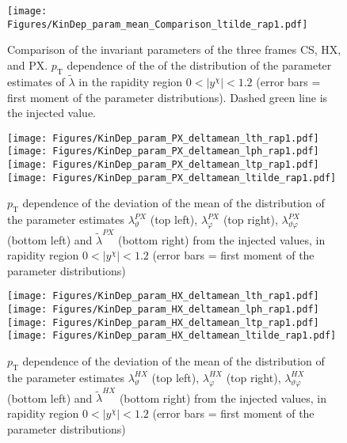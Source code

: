 \documentclass[12pt]{article}
\newcommand{\pT}{p_\mathrm{T}}
\newcommand{\absy}{\left |  y^{\chi} \right |}
\newcommand{\lamtilde}{\tilde{\lambda}}
\newcommand{\lamthHX}{\lambda^{\scriptscriptstyle HX}_\vartheta}
\newcommand{\lamphHX}{\lambda^{\scriptscriptstyle HX}_\varphi}
\newcommand{\lamthphHX}{\lambda^{\scriptscriptstyle HX}_{\vartheta \varphi}}
\newcommand{\lamtildeHX}{\tilde{\lambda}^{\scriptscriptstyle HX}}
\newcommand{\lamthPX}{\lambda^{\scriptscriptstyle PX}_\vartheta}
\newcommand{\lamphPX}{\lambda^{\scriptscriptstyle PX}_\varphi}
\newcommand{\lamthphPX}{\lambda^{\scriptscriptstyle PX}_{\vartheta \varphi}}
\newcommand{\lamtildePX}{\tilde{\lambda}^{\scriptscriptstyle PX}}
\begin{document}




\begin{figure}[htbp]
\centering
\texttt{[image: Figures/KinDep\_param\_mean\_Comparison\_ltilde\_rap1.pdf]}
\caption{Comparison of the invariant parameters of the three frames CS, HX,
and PX. $\pT$ dependence of the of the distribution of the
parameter estimates of $\lamtilde$ in the rapidity region $0<\absy<1.2$ (error bars = first moment of the parameter
distributions). Dashed green line is the injected value.}
\end{figure}
\clearpage









\begin{figure}[htbp]
\centering
\texttt{[image: Figures/KinDep\_param\_PX\_deltamean\_lth\_rap1.pdf]}
\texttt{[image: Figures/KinDep\_param\_PX\_deltamean\_lph\_rap1.pdf]}
\texttt{[image: Figures/KinDep\_param\_PX\_deltamean\_ltp\_rap1.pdf]}
\texttt{[image: Figures/KinDep\_param\_PX\_deltamean\_ltilde\_rap1.pdf]}
\caption{$\pT$ dependence of the deviation of the mean of the distribution of
the parameter estimates $\lamthPX$ (top left), $\lamphPX$ (top right), $\lamthphPX$
(bottom left) and $\lamtildePX$ (bottom right) from the injected values, in rapidity region $0<\absy<1.2$ (error bars = first moment of the parameter
distributions)}
\end{figure}
\clearpage





\begin{figure}[htbp]
\centering
\texttt{[image: Figures/KinDep\_param\_HX\_deltamean\_lth\_rap1.pdf]}
\texttt{[image: Figures/KinDep\_param\_HX\_deltamean\_lph\_rap1.pdf]}
\texttt{[image: Figures/KinDep\_param\_HX\_deltamean\_ltp\_rap1.pdf]}
\texttt{[image: Figures/KinDep\_param\_HX\_deltamean\_ltilde\_rap1.pdf]}
\caption{$\pT$ dependence of the deviation of the mean of the distribution of
the parameter estimates $\lamthHX$ (top left), $\lamphHX$ (top right), $\lamthphHX$
(bottom left) and $\lamtildeHX$ (bottom right) from the injected values, in rapidity region $0<\absy<1.2$ (error bars = first moment of the parameter
distributions)}
\end{figure}
\clearpage
\end{document}
